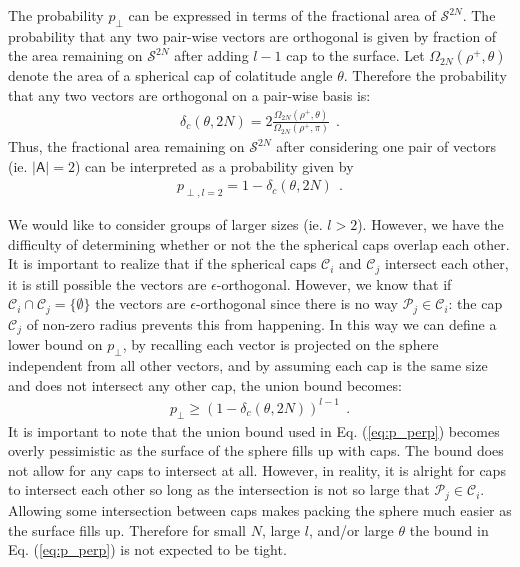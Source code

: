 The probability $p_\perp$ can be expressed in terms of the fractional area of $\mathcal{S}^{2N}$. The probability that any two pair-wise vectors are orthogonal is given by fraction of the area remaining on $\mathcal{S}^{2N}$ after adding $l-1$ cap to the surface. Let $\Omega_{2N}(\rho^+,\theta)$ denote the area of a spherical cap of colatitude angle $\theta$. Therefore the probability that any two vectors are orthogonal on a pair-wise basis is:
\begin{equation}\label{eq:delta_c}
    \begin{aligned}
        \delta_c(\theta,2N) = 2\frac{\Omega_{2N}(\rho^+,\theta)}{\Omega_{2N}(\rho^+,\pi)} \ \ .
    \end{aligned}
\end{equation}
Thus, the fractional area remaining on $\mathcal{S}^{2N}$ after considering one pair of vectors (ie. $\vert \mathsf{A} \vert = 2$) can be interpreted as a probability given by 
\begin{equation}\label{eq:p_perp_l2}
    \begin{aligned}
        p_{\perp,l=2} = 1-\delta_c(\theta,2N) \ \ .
    \end{aligned}
\end{equation}

We would like to consider groups of larger sizes (ie. $l> 2$). However, we have the difficulty of determining whether or not the the spherical caps overlap each other. It is important to realize that if the spherical caps $\mathcal{C}_i$ and $\mathcal{C}_j$ intersect each other, it is still possible the vectors are $\epsilon$-orthogonal. However, we know that if $\mathcal{C}_i\cap\mathcal{C}_j = \lbrace \emptyset \rbrace$ the vectors are $\epsilon$-orthogonal since there is no way $\mathcal{P}_j\in\mathcal{C}_i$: the cap $\mathcal{C}_j$ of non-zero radius prevents this from happening. In this way we can define a lower bound on $p_\perp$, by recalling each vector is projected on the sphere independent from all other vectors, and by assuming each cap is the same size and does not intersect any other cap, the union bound becomes:
\begin{equation}\label{eq:p_perp}
    \begin{aligned}
        p_{\perp} \geq (1-\delta_c(\theta,2N))^{l-1} \ \ .
    \end{aligned}
\end{equation}
It is important to note that the union bound used in Eq. (\ref{eq:p_perp}) becomes overly pessimistic as the surface of the sphere fills up with caps. The bound does not allow for any caps to intersect at all. However, in reality, it is alright for caps to intersect each other so long as the intersection is not so large that $\mathcal{P}_j\in\mathcal{C}_i$. Allowing some intersection between caps makes packing the sphere much easier as the surface fills up. Therefore for small $N$, large $l$, and/or large $\theta$ the bound in Eq. (\ref{eq:p_perp}) is not expected to be tight.

